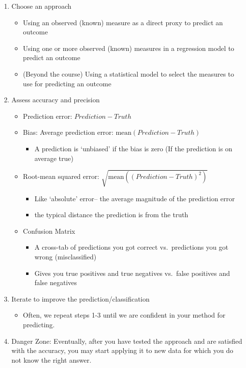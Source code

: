 \documentclass[
  letterpaper,
  DIV=11,
  numbers=noendperiod]{scrreprt}
\providecommand{\tightlist}{%
  \setlength{\itemsep}{0pt}\setlength{\parskip}{0pt}}\usepackage{longtable,booktabs,array}
\begin{document}
\begin{enumerate}
\def\labelenumi{\arabic{enumi}.}
\tightlist
\item
  Choose an approach

  \begin{itemize}
  \tightlist
  \item
    Using an observed (known) measure as a direct proxy to predict an
    outcome
  \item
    Using one or more observed (known) measures in a regression model to
    predict an outcome
  \item
    (Beyond the course) Using a statistical model to select the measures
    to use for predicting an outcome
  \end{itemize}
\item
  Assess accuracy and precision

  \begin{itemize}
  \tightlist
  \item
    Prediction error: \(Prediction - Truth\)
  \item
    Bias: Average prediction error: \(\text{mean}(Prediction - Truth)\)

    \begin{itemize}
    \tightlist
    \item
      A prediction is `unbiased' if the bias is zero (If the prediction
      is on average true)
    \end{itemize}
  \item
    Root-mean squared error:
    \(\sqrt{\text{mean}((Prediction - Truth)^2)}\)

    \begin{itemize}
    \tightlist
    \item
      Like `absolute' error-- the average magnitude of the prediction
      error
    \item
      the typical distance the prediction is from the truth
    \end{itemize}
  \item
    Confusion Matrix

    \begin{itemize}
    \tightlist
    \item
      A cross-tab of predictions you got correct vs.~predictions you got
      wrong (misclassified)
    \item
      Gives you true positives and true negatives vs.~false positives
      and false negatives
    \end{itemize}
  \end{itemize}
\item
  Iterate to improve the prediction/classification

  \begin{itemize}
  \tightlist
  \item
    Often, we repeat steps 1-3 until we are confident in your method for
    predicting.
  \end{itemize}
\item
  Danger Zone: Eventually, after you have tested the approach and are
  satisfied with the accuracy, you may start applying it to new data for
  which you do not know the right answer.
\end{enumerate}
\end{document}
